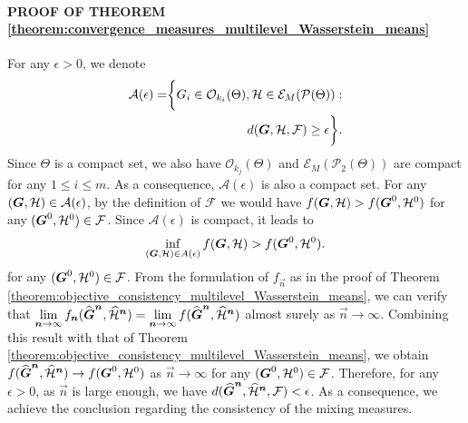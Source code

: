 \paragraph{PROOF OF THEOREM \ref{theorem:convergence_measures_multilevel_Wasserstein_means}} %
For any $\epsilon>0$, we denote
\begin{eqnarray}
\mathcal{A}(\epsilon)=\biggr\{G_{i} \in \mathcal{O}_{k_{i}}(\Theta), \mathcal{H} \in \mathcal{E}_{M}(\mathcal{P}(\Theta)): \nonumber \\
 d(\boldsymbol{G},\mathcal{H},\mathcal{F}) \geq \epsilon\biggr\}. \nonumber
\end{eqnarray}
Since $\Theta$ is a compact set, we also have $\mathcal{O}_{k_{j}}(\Theta)$ and $\mathcal{E}_{M}(\mathcal{P}_{2}(\Theta))$ are compact for any $1 \leq i \leq m$. As a consequence, $\mathcal{A}(\epsilon)$ is also a compact set. For any $(\boldsymbol{G},\mathcal{H}) \in \mathcal{A}(\epsilon)$, by the definition of $\mathcal{F}$ we would have $f(\boldsymbol{G},\mathcal{H}) > f(\boldsymbol{G}^{0},\mathcal{H}^{0})$ for any $(\boldsymbol{G}^{0},\mathcal{H}^{0}) \in \mathcal{F}$. Since $\mathcal{A}(\epsilon)$ is compact, it leads to
\begin{eqnarray}
\inf \limits_{(\boldsymbol{G},\mathcal{H}) \in A(\epsilon)}{f(\boldsymbol{G},\mathcal{H})} > f(\boldsymbol{G}^{0},\mathcal{H}^{0}). \nonumber
\end{eqnarray}
for any $(\boldsymbol{G}^{0},\mathcal{H}^{0}) \in \mathcal{F}$. From the formulation of $f_{\vec{n}}$ as in the proof of Theorem \ref{theorem:objective_consistency_multilevel_Wasserstein_means}, %
we can verify that $\lim \limits_{\boldsymbol{n} \to \infty} f_{\boldsymbol{n}}(\widehat{\boldsymbol{G}}^{\boldsymbol{n}},\widehat{\mathcal{H}}^{\boldsymbol{n}}) = \lim \limits_{\boldsymbol{n} \to \infty} f(\widehat{\boldsymbol{G}}^{\boldsymbol{n}},\widehat{\mathcal{H}}^{\boldsymbol{n}})$ almost surely as 
$\vec{n} \to \infty$. Combining this result with that of Theorem \ref{theorem:objective_consistency_multilevel_Wasserstein_means}, %
we obtain $f(\widehat{\boldsymbol{G}}^{\boldsymbol{n}},\widehat{\mathcal{H}}^{\boldsymbol{n}}) \to f(\boldsymbol{G}^{0},\mathcal{H}^{0})$ as $\vec{n} \to \infty$ for any $(\boldsymbol{G}^{0},\mathcal{H}^{0}) \in \mathcal{F}$. Therefore, for any $\epsilon>0$, as $\vec{n}$ is large enough, we have $d(\boldsymbol{\widehat{G}}^{\boldsymbol{n}},\widehat{\mathcal{H}}^{\boldsymbol{n}},\mathcal{F}) < \epsilon$. As a consequence, we achieve the conclusion regarding the consistency of the mixing measures.

